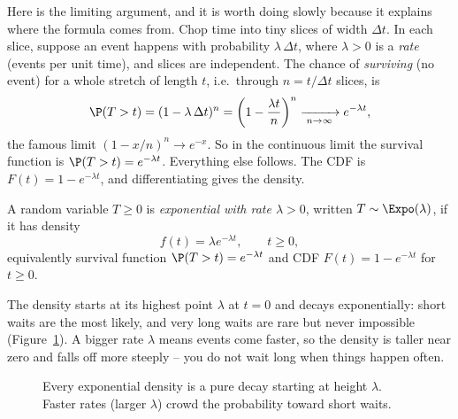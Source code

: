 Here is the limiting argument, and it is worth doing slowly because it explains
where the formula comes from. Chop time into tiny slices of width $\Delta t$. In
each slice, suppose an event happens with probability $\lambda\,\Delta t$, where
$\lambda > 0$ is a \emph{rate} (events per unit time), and slices are
independent. The chance of \emph{surviving} (no event) for a whole stretch of
length $t$, i.e.\ through $n = t/\Delta t$ slices, is
\[
  \P(T > t) = (1 - \lambda\,\Delta t)^{n}
            = \left(1 - \frac{\lambda t}{n}\right)^{n}
            \xrightarrow[\;n\to\infty\;]{} e^{-\lambda t},
\]
the famous limit $(1-x/n)^n \to e^{-x}$. So in the continuous limit the survival
function is $\P(T>t) = e^{-\lambda t}$. Everything else follows. The CDF is
$F(t) = 1 - e^{-\lambda t}$, and differentiating gives the density.

\begin{definition}
\label{ch11:def-exponential}
A random variable $T \ge 0$ is \emph{exponential with rate $\lambda > 0$},
written $T \sim \Expo(\lambda)$, if it has density
\[
  f(t) = \lambda e^{-\lambda t}, \qquad t \ge 0,
\]
equivalently survival function $\P(T > t) = e^{-\lambda t}$ and
CDF $F(t) = 1 - e^{-\lambda t}$ for $t \ge 0$.
\end{definition}

The density starts at its highest point $\lambda$ at $t=0$ and decays
exponentially: short waits are the most likely, and very long waits are rare but
never impossible (Figure~\ref{ch11:fig-expo}). A bigger rate $\lambda$ means
events come faster, so the density is taller near zero and falls off more
steeply -- you do not wait long when things happen often.

\begin{figure}[H]
\centering
{}
\caption{Every exponential density is a pure decay starting at height $\lambda$.
Faster rates (larger $\lambda$) crowd the probability toward short waits.}
\label{ch11:fig-expo}
\end{figure}

